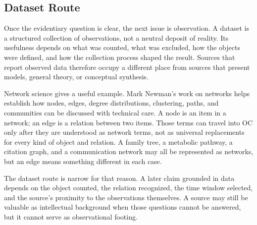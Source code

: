 \documentclass[11pt,a4paper,openany]{book}
\begin{document}
\subsection{Dataset Route}
Once the evidentiary question is clear, the next issue is observation. A dataset is a structured collection of observations, not a neutral deposit of reality. Its usefulness depends on what was counted, what was excluded, how the objects were defined, and how the collection process shaped the result. Sources that report observed data therefore occupy a different place from sources that present models, general theory, or conceptual synthesis. \cite{raf_networks,bak_soc}\par
Network science gives a useful example. Mark Newman's work on networks helps establish how nodes, edges, degree distributions, clustering, paths, and communities can be discussed with technical care. A node is an item in a network; an edge is a relation between two items. Those terms can travel into OC only after they are understood as network terms, not as universal replacements for every kind of object and relation. A family tree, a metabolic pathway, a citation graph, and a communication network may all be represented as networks, but an edge means something different in each case.\par
The dataset route is narrow for that reason. A later claim grounded in data depends on the object counted, the relation recognized, the time window selected, and the source's proximity to the observations themselves. A source may still be valuable as intellectual background when those questions cannot be answered, but it cannot serve as observational footing.\par
\end{document}
